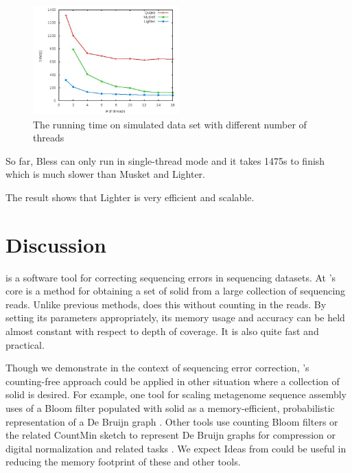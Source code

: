\documentclass[10pt]{article}
\begin{document}
\begin{figure}[h!]
\begin{center}
\includegraphics[width=0.5\textwidth]{runtime.jpg}
\end{center}
\caption{The running time on simulated data set with different number of threads\label{fig:runtime}}
\end{figure}

So far, Bless can only run in single-thread mode and it takes 1475s to finish which is much slower than Musket and Lighter.

The result shows that Lighter is very efficient and scalable. 

\section*{Discussion}
\tool is a software tool for correcting sequencing errors in sequencing datasets.
At \tool's core is a method for obtaining a set of solid \kmers from a large collection of sequencing reads.
Unlike previous methods, \tool does this without counting \kmers in the reads.
By setting its parameters appropriately, its memory usage and accuracy can be held almost constant with respect to depth of coverage.
It is also quite fast and practical.

Though we demonstrate \tool in the context of sequencing error correction, \tool's counting-free approach could be applied in other situation where a collection of solid \kmers is desired.
For example, one tool for scaling metagenome sequence assembly uses of a Bloom filter populated with solid \kmers as a memory-efficient, probabilistic representation of a De Bruijn graph \cite{pell2012scaling}.
Other tools use counting Bloom filters \cite{fan2000summary, bonomi2006improved} or the related CountMin sketch \cite{cormode2005improved} to represent De Bruijn graphs for compression \cite{jones2012compression} or digital normalization and related tasks \cite{zhang2013these}.
We expect Ideas from \tool could be useful in reducing the memory footprint of these and other tools. 
\end{document}
